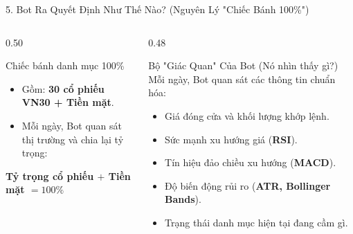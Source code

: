 \documentclass[aspectratio=169, 10pt]{beamer}
\begin{document}
\begin{frame}{5. Bot Ra Quyết Định Như Thế Nào? (Nguyên Lý "Chiếc Bánh 100\%")}
  \begin{columns}[t]
    \begin{column}{0.50\textwidth}
      \begin{block}{Chiếc bánh danh mục 100\%}
        \small
        \begin{itemize}
          \item Gồm: \textbf{30 cổ phiếu VN30 + Tiền mặt}.
          \item Mỗi ngày, Bot quan sát thị trường và chia lại tỷ trọng:
        \end{itemize}
        \vspace{0.5ex}
        \centering
        \textbf{\color{AccentCyan}Tỷ trọng cổ phiếu $+$ Tiền mặt $= 100\%$}
      \end{block}

      \vspace{-0.5ex}
    \end{column}

    \begin{column}{0.48\textwidth}
      \begin{block}{Bộ "Giác Quan" Của Bot (Nó nhìn thấy gì?)}
        \small
        Mỗi ngày, Bot quan sát các thông tin chuẩn hóa:
        \begin{itemize}
          \item Giá đóng cửa và khối lượng khớp lệnh.
          \item Sức mạnh xu hướng giá (\textbf{RSI}).
          \item Tín hiệu đảo chiều xu hướng (\textbf{MACD}).
          \item Độ biến động rủi ro (\textbf{ATR, Bollinger Bands}).
          \item Trạng thái danh mục hiện tại đang cầm gì.
        \end{itemize}
      \end{block}
    \end{column}
  \end{columns}
\end{frame}
\end{document}
